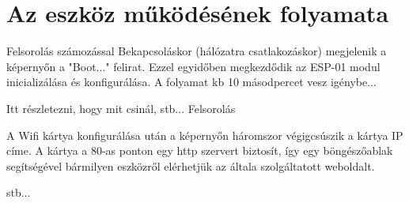 \documentclass[a4paper, 12pt]{article}
\begin{document}
\section{Az eszköz működésének folyamata}
Felsorolás számozással
Bekapcsoláskor (hálózatra csatlakozáskor) megjelenik a képernyőn a "Boot..." felirat. Ezzel egyidőben megkezdődik az ESP-01 modul inicializálása és konfigurálása.
A folyamat kb 10 másodpercet vesz igénybe...

Itt részletezni, hogy mit csinál, stb...
Felsorolás

A Wifi kártya konfigurálása után a képernyőn háromszor végigcsúszik a kártya IP címe.
A kártya a 80-as ponton egy http szervert biztosít, így egy böngészőablak segítségével bármilyen eszközről elérhetjük az általa szolgáltatott weboldalt.

stb...
\end{document}
